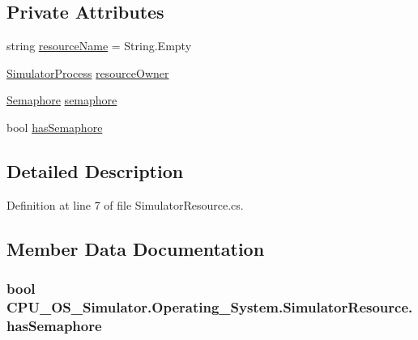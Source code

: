 \subsection*{Private Attributes}
\begin{DoxyCompactItemize}
\item 
string \hyperlink{class_c_p_u___o_s___simulator_1_1_operating___system_1_1_simulator_resource_aea10767db01faa7581b3dfa68f70e027}{resource\+Name} = String.\+Empty
\item 
\hyperlink{class_c_p_u___o_s___simulator_1_1_operating___system_1_1_simulator_process}{Simulator\+Process} \hyperlink{class_c_p_u___o_s___simulator_1_1_operating___system_1_1_simulator_resource_a90288e9eaeb83e4f24b82f88e687f569}{resource\+Owner}
\item 
\hyperlink{class_c_p_u___o_s___simulator_1_1_operating___system_1_1_threading_1_1_semaphore}{Semaphore} \hyperlink{class_c_p_u___o_s___simulator_1_1_operating___system_1_1_simulator_resource_a97f5ed323725aa2ac1506814279771d1}{semaphore}
\item 
bool \hyperlink{class_c_p_u___o_s___simulator_1_1_operating___system_1_1_simulator_resource_a7a588d6cffe080ba59c1fb1e5b140def}{has\+Semaphore}
\end{DoxyCompactItemize}


\subsection{Detailed Description}


Definition at line 7 of file Simulator\+Resource.\+cs.



\subsection{Member Data Documentation}
\hypertarget{class_c_p_u___o_s___simulator_1_1_operating___system_1_1_simulator_resource_a7a588d6cffe080ba59c1fb1e5b140def}{}
\subsubsection[{has\+Semaphore}]{\setlength{\rightskip}{0pt plus 5cm}bool C\+P\+U\+\_\+\+O\+S\+\_\+\+Simulator.\+Operating\+\_\+\+System.\+Simulator\+Resource.\+has\+Semaphore\hspace{0.3cm}{\ttfamily [private]}}\label{class_c_p_u___o_s___simulator_1_1_operating___system_1_1_simulator_resource_a7a588d6cffe080ba59c1fb1e5b140def}


